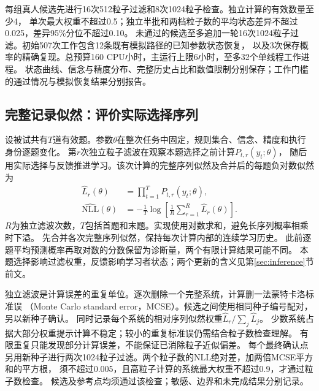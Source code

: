 \documentclass[11pt,a4paper]{article}
\numberwithin{equation}{section}
\begin{document}
每组真人候选先进行16次512粒子过滤和8次1024粒子检查。独立计算的有效数量至少4，
单次最大权重不超过0.5；独立半批和两档粒子数的平均状态差异不超过0.025，差异95\%分位不超过0.10。
未通过的候选至多追加一轮16次1024粒子过滤。初始507次工作包含12条既有模拟路径的已知参数状态恢复，
以及3次保存概率的精确复现。总预算160 CPU小时，主运行上限6小时，至多32个单线程工作进程。
状态曲线、信念与精度分布、完整历史占比和数值限制分别保存；工作门槛的通过情况与模拟恢复结果分别报告。

\subsection{完整记录似然：评价实际选择序列}
设被试共有$T$道有效题。参数$\theta$在整次任务中固定，规则集合、信念、精度和执行身份逐题变化。
第$r$次独立粒子滤波在观察本题选择之前计算$P_{t,r}(y_t;\theta)$，
随后用实际选择与反馈推进学习。该次计算的完整序列似然及合并后的每题负对数似然为
\begin{align}
\widehat L_r(\theta)&=\prod_{t=1}^{T}P_{t,r}(y_t;\theta),\\
\widehat{\mathrm{NLL}}(\theta)&=-\frac1T\log\left[\frac1R\sum_{r=1}^{R}\widehat L_r(\theta)\right].
\label{eq:objective}
\end{align}
$R$为独立滤波次数，$T$包括首题和末题。实现使用对数求和，避免长序列概率相乘时下溢。
先合并各次完整序列似然，保持每次计算内部的连续学习历史。
此前逐题平均预测概率再取对数的分数保留为诊断量，两个有限计算结果可能不同。
本题选择影响过滤权重，反馈影响学习者状态；两个更新的含义见第\ref{sec:inference}节前文。

独立滤波是计算误差的重复单位。逐次删除一个完整系统，计算删一法蒙特卡洛标准误
（Monte Carlo standard error，MCSE）。候选之间使用相同种子编号配对，另以新种子确认。
同时记录每个系统的相对序列似然权重$\widehat L_r/\sum_j\widehat L_j$。
少数系统占据大部分权重提示计算不稳定；较小的重复标准误仍需结合粒子数检查理解。
有限重复只能发现部分计算误差，不能保证已消除粒子近似偏差。
每个最终确认点另用新种子进行两次1024粒子过滤。两个粒子数的NLL绝对差，加两倍MCSE平方和的平方根，
须不超过0.005，且高粒子计算的系统最大权重不超过0.9，才通过粒子数检查。
候选及参考点均须通过该检查；敏感、边界和未完成结果分别记录。
\end{document}
